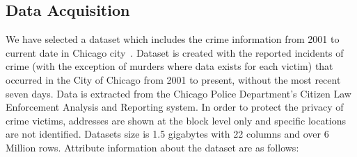 \subsection{Data Acquisition}\label{dataset}
We have selected a dataset which includes the crime information from
2001 to current date in Chicago
city~\cite{hid-sp18-409-www-data.gov}. Dataset is created with the
reported incidents of crime (with the exception of murders where data
exists for each victim) that occurred in the City of Chicago from 2001
to present, without the most recent seven days. Data is extracted from
the Chicago Police Department's Citizen Law Enforcement Analysis and
Reporting system. In order to protect the privacy of crime victims,
addresses are shown at the block level only and specific locations are
not identified. Datasets size is 1.5 gigabytes with 22 columns and
over 6 Million rows. Attribute information about the dataset are as
follows:

